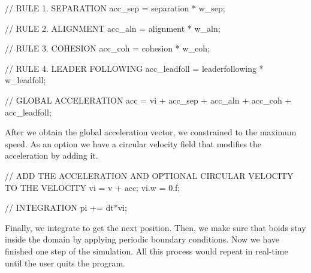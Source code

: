 \begin{cppcode}{0}
// RULE 1. SEPARATION
acc_sep = separation * w_sep;
   
// RULE 2. ALIGNMENT
acc_aln = alignment * w_aln;

// RULE 3. COHESION
acc_coh = cohesion * w_coh;

// RULE 4. LEADER FOLLOWING
acc_leadfoll = leaderfollowing * w_leadfoll;

// GLOBAL ACCELERATION
acc = vi + acc_sep + acc_aln + acc_coh + acc_leadfoll;
\end{cppcode}

After we obtain the global acceleration vector, we constrained to the maximum speed. As an option we have a circular velocity field that modifies the acceleration by adding it.

\begin{cppcode}{0}
// ADD THE ACCELERATION AND OPTIONAL CIRCULAR VELOCITY TO THE VELOCITY
vi = v + acc;
vi.w = 0.f;

// INTEGRATION
pi += dt*vi; 
\end{cppcode}

Finally, we integrate to get the next position. Then, we make sure that boids stay inside the domain by applying periodic boundary conditions. Now we have finished one step of the simulation. All this process would repeat in real-time until the user quits the program.

